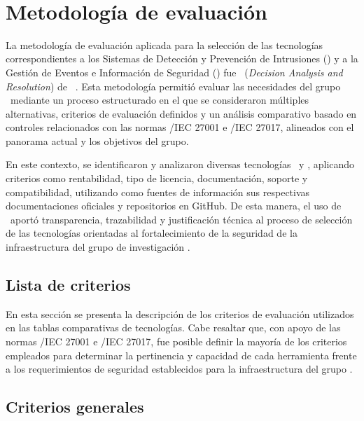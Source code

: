 \label{cap:dar}
\mbox{}\\

\section{Metodología de evaluación}

La metodología de evaluación aplicada para la selección de las tecnologías correspondientes a los Sistemas de Detección y Prevención de 
Intrusiones (\IDPS) y a la Gestión de Eventos e Información de Seguridad (\SIEM) fue \DAR\ (\textit{Decision Analysis and Resolution}) de 
\CMMI~\cite{CMMIInstitute2010}. Esta metodología permitió evaluar las necesidades del grupo \GRID\ mediante un proceso estructurado en el 
que se consideraron múltiples alternativas, criterios de evaluación definidos y un análisis comparativo basado en controles relacionados 
con las normas \ISO/IEC 27001 e \ISO/IEC 27017, alineados con el panorama actual y los objetivos del grupo.

En este contexto, se identificaron y analizaron diversas tecnologías \IDPS\ y \SIEM, aplicando criterios como rentabilidad, tipo de licencia, 
documentación, soporte y compatibilidad, utilizando como fuentes de información sus respectivas documentaciones oficiales y repositorios en 
GitHub. De esta manera, el uso de \DAR\ aportó transparencia, trazabilidad y justificación técnica al proceso de selección de las tecnologías 
orientadas al fortalecimiento de la seguridad de la infraestructura del grupo de investigación \GRID.

\subsection{Lista de criterios}

En esta sección se presenta la descripción de los criterios de evaluación utilizados en las tablas comparativas de tecnologías. Cabe 
resaltar que, con apoyo de las normas \ISO/IEC 27001 e \ISO/IEC 27017, fue posible definir la mayoría de los criterios empleados para 
determinar la pertinencia y capacidad de cada herramienta frente a los requerimientos de seguridad establecidos para la infraestructura del 
grupo \GRID.

\subsection{Criterios generales}

